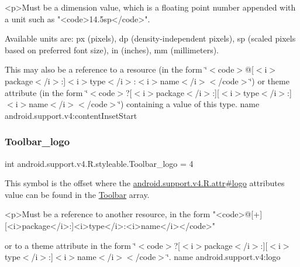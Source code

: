 \begin{DoxyVerb}      <p>Must be a dimension value, which is a floating point number appended with a unit such as "<code>14.5sp</code>".
\end{DoxyVerb}
 Available units are\+: px (pixels), dp (density-\/independent pixels), sp (scaled pixels based on preferred font size), in (inches), mm (millimeters). 

This may also be a reference to a resource (in the form \char`\"{}$<$code$>$@\mbox{[}$<$i$>$package$<$/i$>$\+:\mbox{]}$<$i$>$type$<$/i$>$\+:$<$i$>$name$<$/i$>$$<$/code$>$\char`\"{}) or theme attribute (in the form \char`\"{}$<$code$>$?\mbox{[}$<$i$>$package$<$/i$>$\+:\mbox{]}\mbox{[}$<$i$>$type$<$/i$>$\+:\mbox{]}$<$i$>$name$<$/i$>$$<$/code$>$\char`\"{}) containing a value of this type.  name android.\+support.\+v4\+:content\+Inset\+Start \mbox{\label{classandroid_1_1support_1_1v4_1_1R_1_1styleable_a02896a17125399cab8807ad63d4b9bf2}} 
\subsubsection{\texorpdfstring{Toolbar\+\_\+logo}{Toolbar\_logo}}
{\footnotesize\ttfamily int android.\+support.\+v4.\+R.\+styleable.\+Toolbar\+\_\+logo = 4\hspace{0.3cm}{\ttfamily [static]}}

This symbol is the offset where the \hyperlink{classandroid_1_1support_1_1v4_1_1R_1_1attr_a5b5fc6d210aa9218c697c43ca20f6fdf}{android.\+support.\+v4.\+R.\+attr\#logo} attribute\textquotesingle{}s value can be found in the \hyperlink{classandroid_1_1support_1_1v4_1_1R_1_1styleable_a211358a2f951023c7735caea0fb5ae04}{Toolbar} array.

\begin{DoxyVerb}      <p>Must be a reference to another resource, in the form "<code>@[+][<i>package</i>:]<i>type</i>:<i>name</i></code>"
\end{DoxyVerb}
 or to a theme attribute in the form \char`\"{}$<$code$>$?\mbox{[}$<$i$>$package$<$/i$>$\+:\mbox{]}\mbox{[}$<$i$>$type$<$/i$>$\+:\mbox{]}$<$i$>$name$<$/i$>$$<$/code$>$\char`\"{}.  name android.\+support.\+v4\+:logo \mbox{\label{classandroid_1_1support_1_1v4_1_1R_1_1styleable_a189537d807b0fafbff95c6fc64aba407}} 
